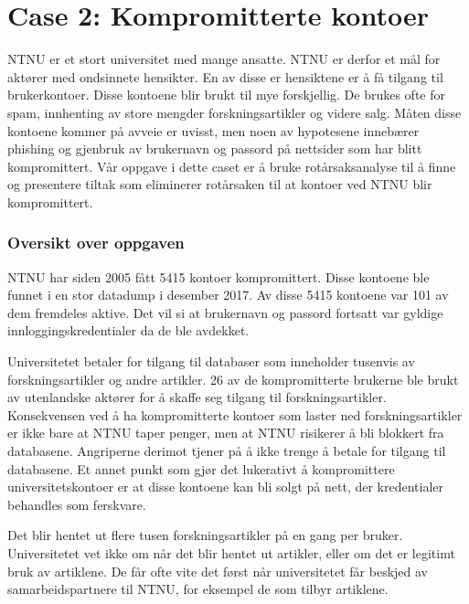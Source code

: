 \section{Case 2: Kompromitterte kontoer}
\label{sec:case_kontoer}
NTNU er et stort universitet med mange ansatte. NTNU er derfor et mål for aktører med ondsinnete hensikter. En av disse er hensiktene er å få tilgang til brukerkontoer. Disse kontoene blir brukt til mye forskjellig. De brukes ofte for spam, innhenting av store mengder forskningsartikler og videre salg. Måten disse kontoene kommer på avveie er uvisst, men noen av hypotesene innebærer phishing og gjenbruk av brukernavn og passord på nettsider som har blitt kompromittert. Vår oppgave i dette caset er å bruke rotårsaksanalyse til å finne og presentere tiltak som eliminerer rotårsaken til at kontoer ved NTNU blir kompromittert.

\subsubsection{Oversikt over oppgaven}
NTNU har siden 2005 fått 5415 kontoer kompromittert. Disse kontoene ble funnet i en stor datadump i desember 2017. Av disse 5415 kontoene var 101 av dem fremdeles aktive. Det vil si at brukernavn og passord fortsatt var gyldige innloggingskredentialer da de ble avdekket. 

Universitetet betaler for tilgang til databaser som inneholder tusenvis av forskningsartikler og andre artikler. 26 av de kompromitterte brukerne ble brukt av utenlandske aktører for å skaffe seg tilgang til forskningsartikler. Konsekvensen ved å ha kompromitterte kontoer som laster ned forskningsartikler er ikke bare at NTNU taper penger, men at NTNU risikerer å bli blokkert fra databasene. Angriperne derimot tjener på å ikke trenge å betale for tilgang til databasene. Et annet punkt som gjør det lukerativt å kompromittere universitetskontoer er at disse kontoene kan bli solgt på nett, der kredentialer behandles som ferskvare. 

Det blir hentet ut flere tusen forskningsartikler på en gang per bruker. Universitetet vet ikke om når det blir hentet ut artikler, eller om det er legitimt bruk av artiklene. De får ofte vite det først når universitetet får beskjed av samarbeidspartnere til NTNU, for eksempel de som tilbyr artiklene. 
